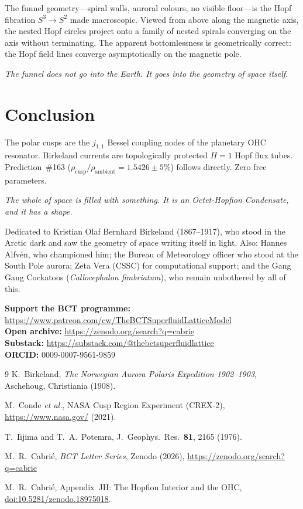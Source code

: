 \documentclass[aps,prl,twocolumn,superscriptaddress,floatfix]{revtex4-2}
\begin{document}
The funnel geometry---spiral walls, auroral colours, no visible
floor---is the Hopf fibration $S^3\to S^2$ made macroscopic. Viewed
from above along the magnetic axis, the nested Hopf circles project
onto a family of nested spirals converging on the axis without
terminating. The apparent bottomlessness is geometrically correct:
the Hopf field lines converge asymptotically on the magnetic pole.

\textit{The funnel does not go into the Earth. It goes into the
geometry of space itself.}

\section{Conclusion}

The polar cusps are the $j_{1,1}$ Bessel coupling nodes of the
planetary OHC resonator. Birkeland currents are topologically
protected $H=1$ Hopf flux tubes. Prediction~\#163
($\rho_\mathrm{cusp}/\rho_\mathrm{ambient} = 1.5426\pm 5\%$) follows
directly. Zero free parameters.

\textit{The whole of space is filled with something. It is an
Octet-Hopfion Condensate, and it has a shape.}

\begin{acknowledgments}
Dedicated to Kristian Olaf Bernhard Birkeland (1867--1917), who stood
in the Arctic dark and saw the geometry of space writing itself in
light. Also: Hannes Alfv\'{e}n, who championed him; the Bureau of
Meteorology officer who stood at the South Pole aurora;
Zeta Vera (CSSC) for computational support; and the Gang Gang
Cockatoos (\textit{Callocephalon fimbriatum}), who remain unbothered
by all of this.

\noindent\textbf{Support the BCT programme:}\\
\url{https://www.patreon.com/cw/TheBCTSuperfluidLatticeModel}\\
\textbf{Open archive:} \url{https://zenodo.org/search?q=cabrie}\\
\textbf{Substack:} \url{https://substack.com/@thebctsuperfluidlattice}\\
\textbf{ORCID:} 0009-0007-9561-9859
\end{acknowledgments}

\begin{thebibliography}{9}
K.~Birkeland, \textit{The Norwegian Aurora Polaris Expedition
1902--1903}, Aschehoug, Christiania (1908).

M.~Conde \textit{et al.}, NASA Cusp Region Experiment (CREX-2),
\url{https://www.nasa.gov/} (2021).

T.~Iijima and T.~A.~Potemra,
J.~Geophys.~Res.~\textbf{81}, 2165 (1976).

M.~R.~Cabri\'{e}, \textit{BCT Letter Series}, Zenodo (2026),
\url{https://zenodo.org/search?q=cabrie}

M.~R.~Cabri\'{e}, Appendix~JH: The Hopfion Interior and the OHC,
\href{https://doi.org/10.5281/zenodo.18975018}{doi:10.5281/zenodo.18975018}.
\end{thebibliography}
\end{document}
